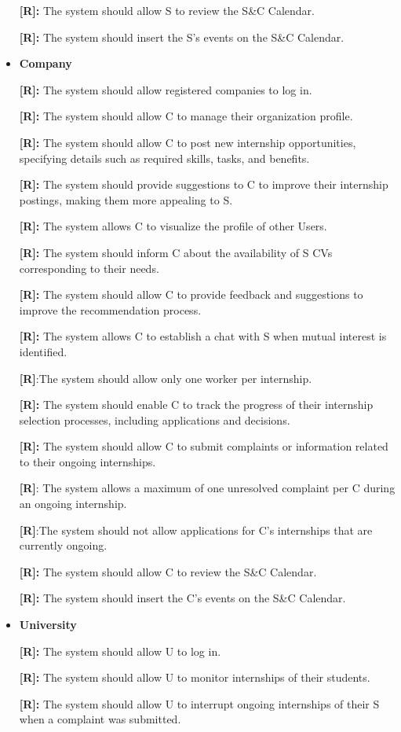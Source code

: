 \begin{itemize}
\textbf{[R\creq]:} The system should allow S to review the S\&C Calendar.

\textbf{[R\creq]:} The system should insert the S's events on the S\&C Calendar.

\item 
    \textbf{Company}

\textbf{[R\creq]:} The system should allow registered companies to log in.

\textbf{[R\creq]:} The system should allow C to manage their organization
profile.

\textbf{[R\creq]:} The system should allow C to post new internship
opportunities, specifying details such as required skills, tasks, and
benefits.

\textbf{[R\creq]:} The system should provide suggestions to C to improve their
internship postings, making them more appealing to S.

\textbf{[R\creq]:} The system allows C to visualize the profile of other Users.

\textbf{[R\creq]:} The system should inform C about the availability of S CVs
corresponding to their needs.

\textbf{[R\creq]:} The system should allow C to provide feedback and suggestions
to improve the recommendation process.

\textbf{[R\creq]:} The system allows C to establish a chat with S when mutual
interest is identified.

\textbf{[R\creq]}:The system should allow only one worker per internship.

\textbf{[R\creq]:} The system should enable C to track the progress of their
internship selection processes, including applications and decisions.

\textbf{[R\creq]:} The system should allow C to submit complaints or information
related to their ongoing internships.

\textbf{[R\creq]}: The system allows a maximum of one unresolved complaint per C  during an ongoing internship.

\textbf{[R\creq]}:The system should not allow applications for C's internships that are currently ongoing.

\textbf{[R\creq]:} The system should allow C to review the S\&C Calendar.

\textbf{[R\creq]:} The system should insert the C's events on the S\&C Calendar.

\item
    \textbf{University}

\textbf{[R\creq]:} The system should allow U to log in.

\textbf{[R\creq]:} The system should allow U to monitor internships of their
students.

\textbf{[R\creq]:} The system should allow U to interrupt ongoing internships of their S when a complaint was submitted.
\end{itemize}

